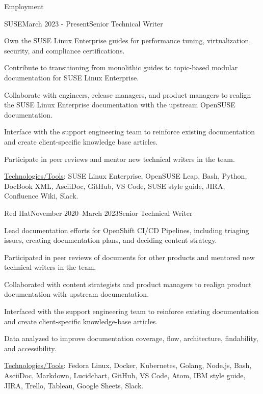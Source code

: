 \documentclass{resume} %
\begin{document}
\begin{rSection}{Employment}

\begin{rSubsection}{SUSE}{March 2023 - Present}{Senior Technical Writer}{}
\item Own the SUSE Linux Enterprise guides for performance tuning, virtualization, security, and compliance certifications.
\item Contribute to transitioning from monolithic guides to topic-based modular documentation for SUSE Linux Enterprise.
\item Collaborate with engineers, release managers, and product managers to realign the SUSE Linux Enterprise documentation with the upstream OpenSUSE documentation.
\item Interface with the support engineering team to reinforce existing documentation and create client-specific knowledge base articles.
\item Participate in peer reviews and mentor new technical writers in the team. 
\item \underline{Technologies/Tools}: SUSE Linux Enterprise, OpenSUSE Leap, Bash, Python, DocBook XML, AsciiDoc, GitHub, VS Code, SUSE style guide, JIRA, Confluence Wiki, Slack. 
\end{rSubsection}

\begin{rSubsection}{Red Hat}{November 2020–March 2023}{Senior Technical Writer}{}
\item Lead documentation efforts for OpenShift CI/CD Pipelines, including triaging issues, creating documentation plans, and deciding content strategy.
\item Participated in peer reviews of documents for other products and mentored new technical writers in the team. 
\item Collaborated with content strategists and product managers to realign product documentation with upstream documentation.
\item Interfaced with the support engineering team to reinforce existing documentation and create client-specific knowledge-base articles.
\item Data analyzed to improve documentation coverage, flow, architecture, findability, and accessibility. 
\item \underline{Technologies/Tools}: Fedora Linux, Docker, Kubernetes, Golang, Node.js, Bash, AsciiDoc, Markdown, Lucidchart, GitHub, VS Code, Atom, IBM style guide, JIRA, Trello, Tableau, Google Sheets, Slack. 
\end{rSubsection}


\end{rSection}
\end{document}
